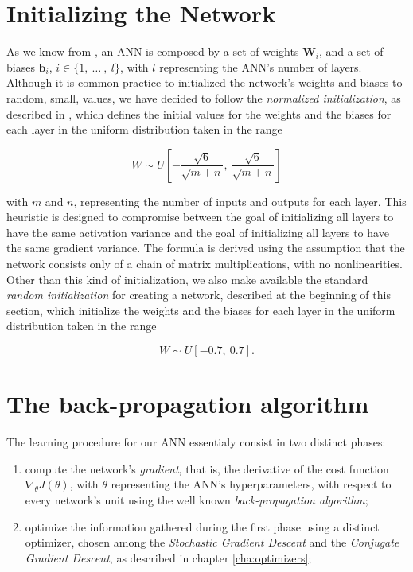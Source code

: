 	\section{Initializing the Network} %
	\label{sec:initializing_the_network}
		As we know from \cite{Goodfellow-et-al-2016,haykin2009neural,mitchell1997machine}, an ANN is composed by
		a set of weights $\mathbf{W}_{i}$, and a set of biases $\mathbf{b}_{i}$,
		$i \in \{ 1, \ \ldots \ , \ l \}$, with $l$ representing the ANN's number of layers. Although it is common
		practice to initialized the network's weights and biases to random, small, values, we have decided to
		follow the \textit{normalized initialization}, as described in
		\cite{Glorot10understandingthe,Goodfellow-et-al-2016}, which defines the initial values for the weights
		and the biases for each layer in the uniform distribution taken in the range

		\begin{equation*}
		    W \sim U \left [ -\frac{\sqrt{6}}{\sqrt{m + n}}, \ \frac{\sqrt{6}}{\sqrt{m + n}} \right ]
		\end{equation*}

		with $m$ and $n$, representing the number of inputs and outputs for each layer. This heuristic is
		designed to compromise between the goal of initializing all layers to have the same activation variance
		and the goal of initializing all layers to have the same gradient variance. The formula is derived using
		the assumption that the network consists only of a chain of matrix multiplications, with no
		nonlinearities. Other than this kind of initialization, we also make available the standard
		\textit{random initialization} for creating a network, described at the beginning of this section, which
		initialize the weights and the biases for each layer in the uniform distribution taken in the range

		\begin{equation*}
		    W \sim U \left [ - 0.7, \ 0.7 \right ].
		\end{equation*}

	\section{The back-propagation algorithm} %
	\label{sec:the_back-propagation_algorithm}
		The learning procedure for our ANN essentialy consist in two distinct phases:

		\begin{enumerate}
			\item compute the network's \textit{gradient}, that is, the derivative of the cost function
			$\nabla_{\theta} J(\theta)$, with $\theta$ representing the ANN's hyperparameters, with respect to
			every network's unit using the well known \textit{back-propagation algorithm};
			\item optimize the information gathered during the first phase using a distinct optimizer, chosen
			among the \textit{Stochastic Gradient Descent} and the \textit{Conjugate Gradient Descent}, as
			described in chapter \ref{cha:optimizers};
		\end{enumerate}

